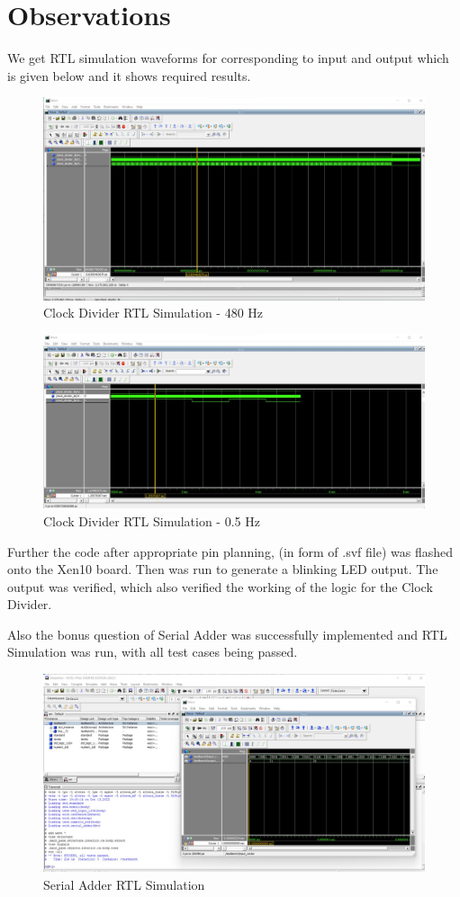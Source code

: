 \documentclass[12pt]{article}
\begin{document}
\section{Observations}
 
We get RTL simulation waveforms for corresponding to input and output which is given below and it shows required results.

\begin{figure}[H]
\centering
  \includegraphics[scale=0.35]{Images/ClockDiv480Hz_RTLSimulation.jpeg}
  \caption{Clock Divider RTL Simulation - 480 Hz}
\end{figure}

\begin{figure}[H]
\centering
  \includegraphics[scale=0.35]{Images/ClockDiv0.5Hz_RTLSimulation.jpeg}
  \caption{Clock Divider RTL Simulation - 0.5 Hz}
\end{figure}

Further the code after appropriate pin planning, (in form of .svf file) was flashed onto the Xen10 board. Then was run to generate a blinking LED output. The output was verified, which also verified the working of the logic for the Clock Divider.

Also the bonus question of Serial Adder was successfully implemented and RTL Simulation was run, with all test cases being passed.

\begin{figure}[H]
\centering
  \includegraphics[scale=0.35]{Images/SerialAdder_RTLSimulation.jpeg}
  \caption{Serial Adder RTL Simulation}
\end{figure}
\end{document}
